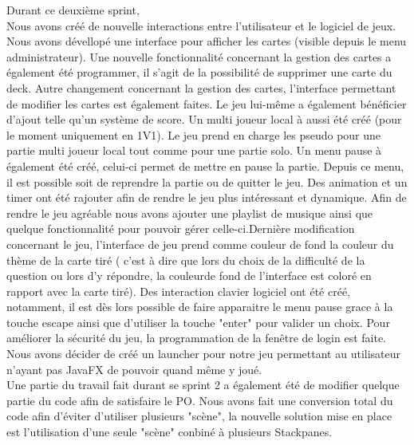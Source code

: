 Durant ce deuxième sprint,\\
Nous avons créé de nouvelle interactions entre l'utilisateur et le logiciel de jeux. Nous avons dévellopé une interface pour 
afficher les cartes (visible depuis le menu administrateur). Une nouvelle fonctionnalité concernant la gestion des cartes a également 
été programmer, il s'agit de la possibilité de supprimer une carte du deck. Autre changement concernant la gestion des cartes, 
l'interface permettant de modifier les cartes est également faites. Le jeu lui-même a également bénéficier d'ajout telle qu'un système 
de score. Un multi joueur local à aussi été créé (pour le moment uniquement en 1V1). Le jeu prend en charge les pseudo pour une partie 
multi joueur local tout comme pour une partie solo. Un menu pause à également été créé, celui-ci permet de mettre en pause la partie.
Depuis ce menu, il est possible soit de reprendre la partie ou de quitter le jeu. Des animation et un timer ont été rajouter afin de 
rendre le jeu plus intéressant et dynamique. Afin de rendre le jeu agréable nous avons ajouter une playlist de musique ainsi que 
quelque fonctionnalité pour pouvoir gérer celle-ci.Dernière modification concernant le jeu, l'interface de jeu prend comme couleur de 
fond la couleur du thème de la carte tiré ( c'est à dire que lors du choix de la difficulté de la question ou lors d'y répondre, la 
couleurde fond de l'interface est coloré en rapport avec la carte tiré). Des interaction clavier logiciel ont été créé, notamment, il 
est dès lors possible de faire apparaitre le menu pause grace à la touche escape ainsi que d'utiliser la touche "enter" pour valider 
un choix. Pour améliorer la sécurité du jeu, la programmation de la fenêtre de login est faite. Nous avons décider de créé un launcher 
pour notre jeu permettant au utilisateur n'ayant pas JavaFX de pouvoir quand même y joué.\\
Une partie du travail fait durant se sprint 2 a également été de modifier quelque partie du code afin de satisfaire le PO.
Nous avons fait une conversion total du code afin d'éviter d'utiliser plusieurs "scène", la nouvelle solution mise en place est
l'utilisation d'une seule "scène" conbiné à plusieurs Stackpanes.  